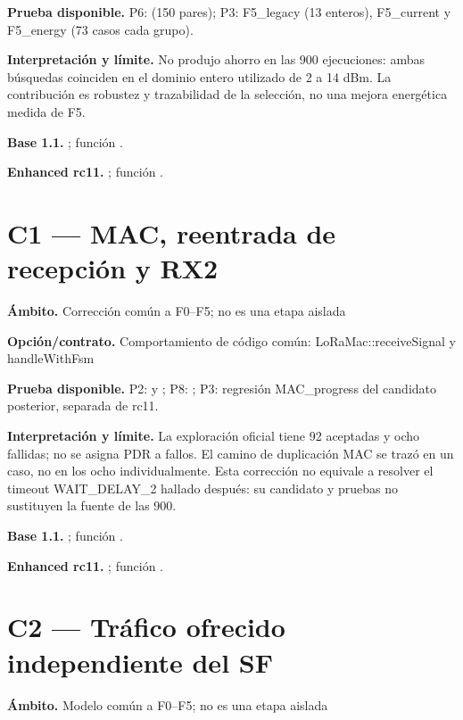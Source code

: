 \documentclass[10pt,a4paper]{article}
\begin{document}
\textbf{Prueba disponible.} P6:  (150 pares); P3: F5\_legacy (13 enteros), F5\_current y F5\_energy (73 casos cada grupo).

\textbf{Interpretación y límite.} No produjo ahorro en las 900 ejecuciones: ambas búsquedas coinciden en el dominio entero utilizado de 2 a 14 dBm. La contribución es robustez y trazabilidad de la selección, no una mejora energética medida de F5.

\textbf{Base 1.1.} ; función .\par
\textbf{Enhanced rc11.} ; función .\par
\section*{C1 — MAC, reentrada de recepción y RX2}
\textbf{Ámbito.} Corrección común a F0–F5; no es una etapa aislada

\textbf{Opción/contrato.} Comportamiento de código común: LoRaMac::receiveSignal y handleWithFsm

\textbf{Prueba disponible.} P2:  y ; P8: ; P3: regresión MAC\_progress del candidato posterior, separada de rc11.

\textbf{Interpretación y límite.} La exploración oficial tiene 92 aceptadas y ocho fallidas; no se asigna PDR a fallos. El camino de duplicación MAC se trazó en un caso, no en los ocho individualmente. Esta corrección no equivale a resolver el timeout WAIT\_DELAY\_2 hallado después: su candidato y pruebas no sustituyen la fuente de las 900.

\textbf{Base 1.1.} ; función .\par
\textbf{Enhanced rc11.} ; función .\par
\section*{C2 — Tráfico ofrecido independiente del SF}
\textbf{Ámbito.} Modelo común a F0–F5; no es una etapa aislada
\end{document}
